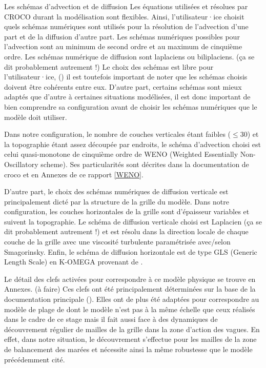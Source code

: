 \documentclass[10pt,a4paper,titlepage]{article}
\begin{document}
\begin{codeEnv}{Les schémas d'advection et de diffusion}
Les équations utilisées et résolues par CROCO durant la modélisation sont flexibles.
Ainsi, l'utilisateur·ice choisit quels schémas numériques sont utilisés pour la résolution de l'advection d'une part et de la diffusion d'autre part.
Les schémas numériques possibles pour l'advection sont au minimum de second ordre et au maximum de cinquième ordre.
Les schémas numérique de diffusion sont laplaciens ou biliplaciens. (ça se dit probablement autrement !)
Le choix des schémas est libre pour l'utilisateur·ice, (\cite{schemas_advection}) il est toutefois important de noter que les schémas choisis doivent être cohérents entre eux.
D'autre part, certains schémas sont mieux adaptés que d'autre à certaines situations modélisées, il est donc important de bien comprendre sa configuration avant de choisir les schémas numériques que le modèle doit utiliser.

Dans notre configuration, le nombre de couches verticales étant faibles ($\leq 30$) et la topographie étant assez découpée par endroits, le schéma d'advection choisi est celui quasi-monotone de cinquième ordre de WENO (Weighted Essentially Non-Oscillatory scheme). 
Ses particularités sont décrites dans la documentation de croco et en Annexes de ce rapport \ref{WENO}.

D'autre part, le choix des schémas numériques de diffusion verticale est principalement dicté par la structure de la grille du modèle.
Dans notre configuration, les couches horizontales de la grille sont d'épaisseur variables et suivent la topographie.
Le schéma de diffusion verticale choisi est Laplacien (ça se dit probablement autrement !) et est résolu dans la direction locale de chaque couche de la grille avec une viscosité turbulente paramétrisée avec/selon Smagorinsky.
Enfin, le schéma de diffusion horizontale est de type GLS (Generic Length Scale) en K-OMEGA provenant de \cite{GLS_KOMEGA_kolmogorov1941equations}.
\end{codeEnv}

Le détail des clefs activées pour correspondre à ce modèle physique se trouve en Annexes. (à faire)
Ces clefs ont été principalement déterminées sur la base de la documentation principale (\cite{cppkeys_description}).
Elles ont de plus été adaptées pour correspondre au modèle de plage de \cite{swash_article_MARCHESIELLO2021101816} dont le modèle n'est pas à la même échelle que ceux réalisés dans le cadre de ce stage mais il fait aussi face à des dynamiques de découvrement régulier de mailles de la grille dans la zone d'action des vagues.
En effet, dans notre situation, le découvrement s'effectue pour les mailles de la zone de balancement des marées et nécessite ainsi la même robustesse que le modèle précédemment cité.
\end{document}
